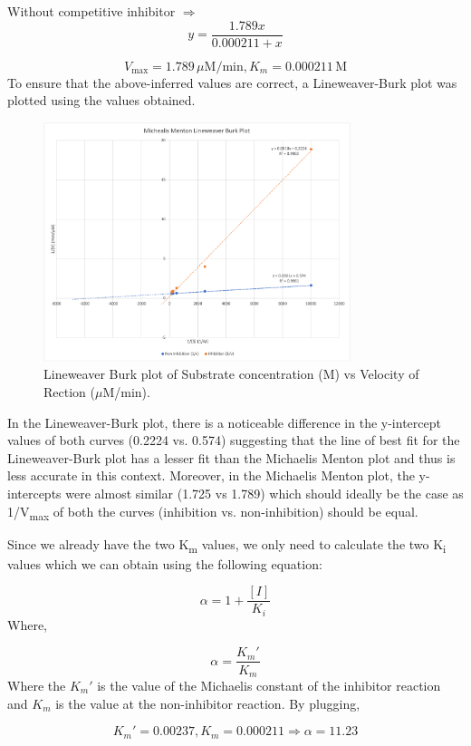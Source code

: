 \documentclass[pdflatex,sn-mathphys]{sn-jnl}%
\theoremstyle{thmstyleone}%
\theoremstyle{thmstyletwo}%
\theoremstyle{thmstylethree}%
\begin{document}
Without competitive inhibitor $\Rightarrow$
\[y = \frac{1.789x}{0.000211+ x}\]

\[ V_{\text{max}} = 1.789\,\mu\text{M/min},  K_m = 0.000211\,\text{M}\]
To ensure that the above-inferred values are correct, a Lineweaver-Burk plot
was plotted using the values obtained.

\begin{figure}[h]
  \centering
  \includegraphics[width=0.8\textwidth]{photos/lbp.png}
  \caption{Lineweaver Burk plot of Substrate concentration (M) vs Velocity of Rection  ($\mu$M/min). }\label{fig3}
\end{figure}

In the Lineweaver-Burk plot, there is a noticeable difference in the
y-intercept values of both curves (0.2224 vs. 0.574) suggesting that the line
of best fit for the Lineweaver-Burk plot has a lesser fit than the Michaelis
Menton plot and thus is less accurate in this context. Moreover, in the
Michaelis Menton plot, the y-intercepts were almost similar (1.725 vs 1.789)
which should ideally be the case as 1/{V\textsubscript{max}} of both the curves
(inhibition vs. non-inhibition) should be equal.

Since we already have the two K\textsubscript{m} values, we only need to
calculate the two K\textsubscript{i} values which we can obtain using the
following equation:

\[\alpha = 1 + \frac{[I]}{K_i}\]
Where,

\[\alpha = \frac{K_m'}{K_m}\]
Where the $K_m'$ is the value of the Michaelis constant of the inhibitor
reaction and $K_m$ is the value at the non-inhibitor reaction. By plugging,

\[K_m' = 0.00237, K_m = 0.000211 \Rightarrow \alpha = 11.23\]
\end{document}
